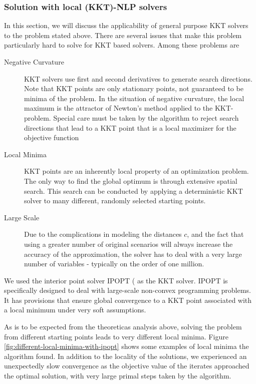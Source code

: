 \documentclass[a4paper, 12pt] {article}
\begin{document}
\subsubsection{Solution with local (KKT)-NLP solvers}
In this section, we will discuss the applicability of general purpose KKT solvers to the problem stated above. There are several issues that make this problem particularly hard to solve for KKT based solvers. Among these problems are
\begin{description}
\item[Negative Curvature] KKT solvers use first and second derivatives to generate search directions. Note that KKT points are only stationary points, not guaranteed to be minima of the problem. In the situation of negative curvature, the local maximum is the attractor of Newton's method applied to the KKT-problem. Special care must be taken by the algorithm to reject search directions that lead to a KKT point that is a local maximizer for the objective function
\item[Local Minima] KKT points are an inherently local property of an optimization problem. The only way to find the global optimum is through extensive spatial search. This search can be conducted by applying a deterministic KKT solver to many different, randomly selected starting points.
\item[Large Scale] Due to the complications in modeling the distances $c$, and the fact that using a greater number of original scenarios will always increase the accuracy of the approximation, the solver has to deal with a very large number of variables - typically on the order of one million.
\end{description}
We used the interior point solver IPOPT (\cite{IpoptImplementation2006} as the KKT solver. IPOPT is specifically designed to deal with large-scale non-convex programming problems. It has provisions that ensure global convergence to a KKT point associated with a local minimum under very soft assumptions.

As is to be expected from the theoreticas analysis above, solving the problem from different starting points leads to very different local minima. Figure \ref{fig:different-local-minima-with-ipopt} shows some examples of local minima the algorithm found. In addition to the locality of the solutions, we experienced an unexpectedly slow convergence as the objective value of the iterates approached the optimal solution, with very large primal steps taken by the algorithm. 
\end{document}
